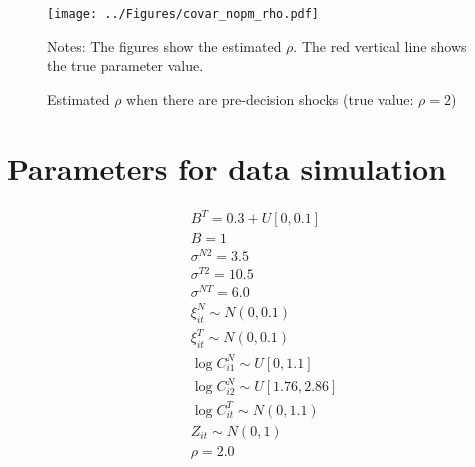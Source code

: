 \documentclass[11pt,letterpaper]{article}
\begin{document}
\begin{figure}[H]
  \centering
  \caption{Estimated $\rho$ when there are pre-decision shocks (true value: $\rho = 2$)}
  \texttt{[image: ../Figures/covar\_nopm\_rho.pdf]}
  \label{fig:covar_nopm_rho}
  \footnotesize
  \begin{tablenotes}
    \item Notes:
      The figures show the estimated $\rho$.
      The red vertical line shows the true parameter value.
  \end{tablenotes}
\end{figure}

\section{Parameters for data simulation}

\begin{align*}
  &B^T = 0.3 + U[0, 0.1] \\
  &B = 1 \\
  &\sigma^{N2} = 3.5 \\ 
  &\sigma^{T2} = 10.5 \\ 
  &\sigma^{NT} = 6.0 \\ 
  &\xi_{it}^N \sim N(0, 0.1) \\
  &\xi_{it}^T \sim N(0, 0.1) \\
  &\log C_{i1}^N \sim U[0, 1.1] \\
  &\log C_{i2}^N \sim U[1.76, 2.86] \\
  &\log C_{it}^T \sim N(0, 1.1) \\
  &Z_{it} \sim N(0, 1) \\
  &\rho = 2.0
\end{align*}

  
\end{document}
